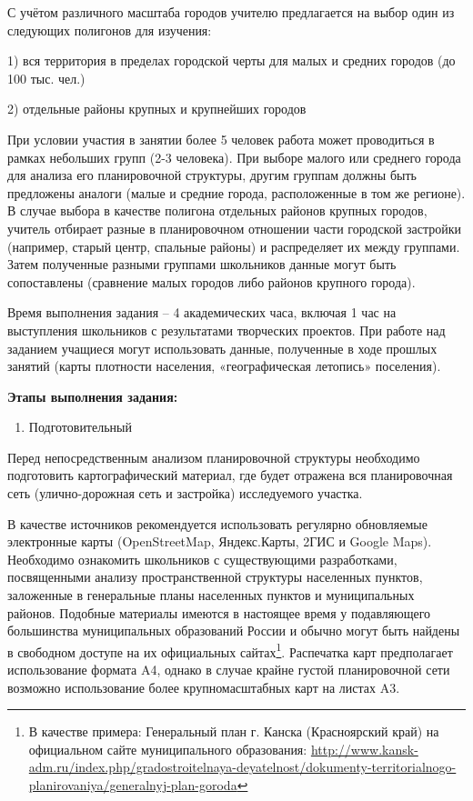 \documentclass[
  11pt,
  russian,
]{book}
\providecommand{\tightlist}{%
  \setlength{\itemsep}{0pt}\setlength{\parskip}{0pt}}
\begin{document}
С учётом различного масштаба городов учителю предлагается на выбор один из следующих полигонов для изучения:

1) вся территория в пределах городской черты для малых и средних городов (до 100 тыс. чел.)

2) отдельные районы крупных и крупнейших городов

При условии участия в занятии более 5 человек работа может проводиться в рамках
небольших групп (2-3 человека). При выборе малого или среднего города для
анализа его планировочной структуры, другим группам должны быть предложены
аналоги (малые и средние города, расположенные в том же регионе). В случае
выбора в качестве полигона отдельных районов крупных городов, учитель отбирает
разные в планировочном отношении части городской застройки (например, старый
центр, спальные районы) и распределяет их между группами. Затем полученные
разными группами школьников данные могут быть сопоставлены (сравнение малых
городов либо районов крупного города).

Время выполнения задания -- 4 академических часа, включая 1 час на выступления
школьников с результатами творческих проектов. При работе над заданием учащиеся могут использовать данные, полученные в ходе прошлых занятий (карты плотности населения, «географическая летопись» поселения).

\textbf{Этапы выполнения задания:}

\begin{enumerate}
\def\labelenumi{\arabic{enumi}.}
\tightlist
\item
  Подготовительный
\end{enumerate}

Перед непосредственным анализом планировочной структуры необходимо подготовить картографический материал, где будет отражена вся планировочная сеть (улично-дорожная сеть и застройка) исследуемого участка.

В качестве источников рекомендуется использовать регулярно обновляемые
электронные карты (OpenStreetMap, Яндекс.Карты, 2ГИС и Google Maps). Необходимо ознакомить школьников с существующими разработками, посвященными анализу пространственной структуры населенных пунктов, заложенные в генеральные планы населенных пунктов и муниципальных
районов. Подобные материалы имеются в настоящее время у подавляющего
большинства муниципальных образований России и обычно могут быть найдены в
свободном доступе на их официальных сайтах\footnote{В качестве примера: Генеральный план г. Канска (Красноярский край) на официальном сайте муниципального образования:
  \url{http://www.kansk-adm.ru/index.php/gradostroitelnaya-deyatelnost/dokumenty-territorialnogo-planirovaniya/generalnyj-plan-goroda}}. Распечатка карт предполагает использование формата A4, однако в случае крайне густой планировочной сети возможно использование более крупномасштабных карт на листах A3.
\end{document}
